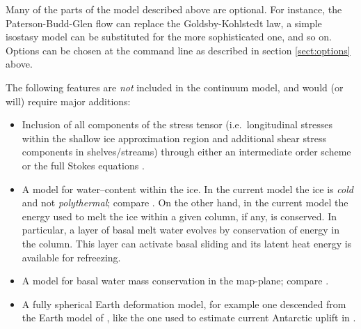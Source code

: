 \documentclass[12pt,final]{amsart}
\begin{document}
Many of the parts of the model described above are optional.  For instance, the Paterson-Budd-Glen \cite{PatersonBudd} flow can replace the Goldsby-Kohlstedt law, a simple isostasy model can be substituted for the more sophisticated one, and so on.  Options can be chosen at the command line as described in section \ref{sect:options} above.

The following features are \emph{not} included in the continuum model, and would (or will) require major additions:
\begin{itemize}
\item Inclusion of all components of the stress tensor (i.e.~longitudinal stresses within the shallow ice approximation region and additional shear stress components in shelves/streams) through either an intermediate order scheme \cite{Blatter,Hindmarsh06,SaitoEISMINT} or the full Stokes equations \cite{Fowler}.
\item A model for water--content within the ice.  In the current model the ice is \emph{cold} and not \emph{polythermal}; compare \cite{Greve}.  On the other hand, in the current model the energy used to melt the ice within a given column, if any, is conserved.  In particular, a layer of basal melt water evolves by conservation of energy in the column.  This layer can activate basal sliding and its latent heat energy is available for refreezing.
\item A model for basal water mass conservation in the map-plane; compare \cite{JohnsonFastook}.
\item A fully spherical Earth deformation model, for example one descended from the Earth model of \cite{Peltier}, like the one used to estimate current Antarctic uplift in \cite{IvinsJames2005}.
\end{itemize}
\end{document}
